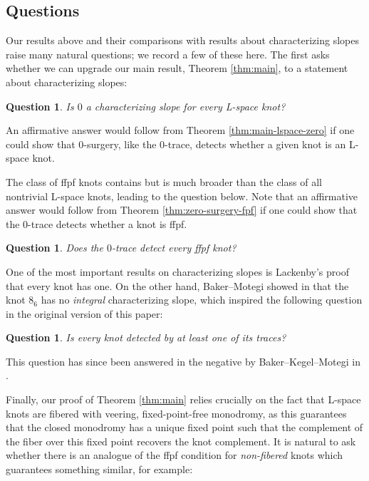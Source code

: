 \documentclass[11pt]{amsart}
\newtheorem {question}[theorem]{Question}
\numberwithin{equation}{section}
\numberwithin{theorem}{section}
\theoremstyle{definition}
\begin{document}
\subsection{Questions} Our results  above and their  comparisons with results about characterizing slopes raise many natural questions; we record a few of these here. The first asks whether we can upgrade our main result, Theorem \ref{thm:main}, to a statement about characterizing slopes:

\begin{question}
Is $0$ a characterizing slope for every L-space knot?
\end{question}

An affirmative answer   would follow from Theorem \ref{thm:main-lspace-zero} if one could show that  $0$-surgery, like the $0$-trace, detects whether a given knot is an L-space knot.

The class of ffpf knots contains but is much broader than the class of all nontrivial L-space knots, leading to the question below. Note that an affirmative answer would follow from Theorem \ref{thm:zero-surgery-fpf} if one could show that the 0-trace detects whether a knot is ffpf.

\begin{question}
Does the $0$-trace detect every ffpf knot?
\end{question}

One of the most important results on characterizing slopes is Lackenby's proof \cite{lackenby-characterizing} that every knot has one. On the other hand, Baker--Motegi showed in \cite{baker-motegi} that the knot $8_6$ has no \emph{integral} characterizing slope, which inspired the following question in the original version of this paper:

\begin{question}
Is every knot detected by at least one of its traces?
\end{question}

This question has since been answered in the negative by Baker--Kegel--Motegi in \cite{baker-kegel-motegi}.



Finally, our proof of Theorem \ref{thm:main} relies crucially on the fact that L-space knots are fibered with veering, fixed-point-free monodromy, as this guarantees that the closed monodromy has a unique fixed point such that the complement of the fiber over this fixed point recovers the knot complement. It is natural to ask whether there is an analogue of the ffpf condition for \emph{non-fibered} knots which guarantees something similar, for example:
\end{document}
